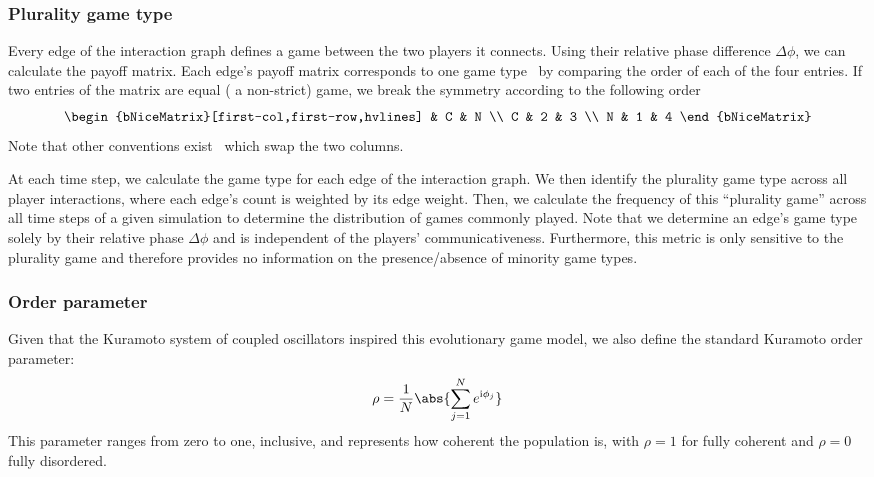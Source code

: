 \documentclass[pdflatex,twocolumn,sn-nature,super]{sn-jnl}
\begin{document}
\subsubsection{Plurality game type}
Every edge of the interaction graph
defines a game between the two players it connects.
Using their relative phase difference $\Delta \phi$,
we can calculate the payoff matrix.
Each edge's payoff matrix corresponds to one game type~\citep{bruns2015names}
by comparing the order of each of the four entries.
If two entries of the matrix are equal (\ie{} a non-strict) game,
we break the symmetry according to the following order
\begin{equation}
\begin{bNiceMatrix}[first-col,first-row,hvlines]
  & C & N \\
  C & 2 & 3 \\
  N & 1 & 4
\end{bNiceMatrix}
\end{equation}
Note that other conventions exist~\citep{bruns2015names}
which swap the two columns.

At each time step, we calculate the game type for each edge
of the interaction graph.
We then identify the plurality game type across all player interactions,
where each edge's count is weighted by its edge weight.
Then, we calculate the frequency of this ``plurality game'' across
all time steps of a given simulation to determine the distribution
of games commonly played.
Note that we determine an edge's game type solely
by their relative phase $\Delta \phi$ and is independent
of the players' communicativeness.
Furthermore, this metric is only sensitive to the
plurality game and therefore provides no information
on the presence/absence of minority game types.

\subsubsection{Order parameter}
Given that the Kuramoto system of coupled oscillators
inspired this evolutionary game model,
we also define the standard Kuramoto order parameter:
\begin{equation}
  \rho = \frac{1}{N} \abs{\sum_{j=1}^N e^{\im \phi_j}}
  \label{eq:order_parameter}
\end{equation}
This parameter ranges from zero to one, inclusive,
and represents how coherent the population is,
with $\rho = 1$ for fully coherent and $\rho = 0$ fully disordered.
\end{document}
